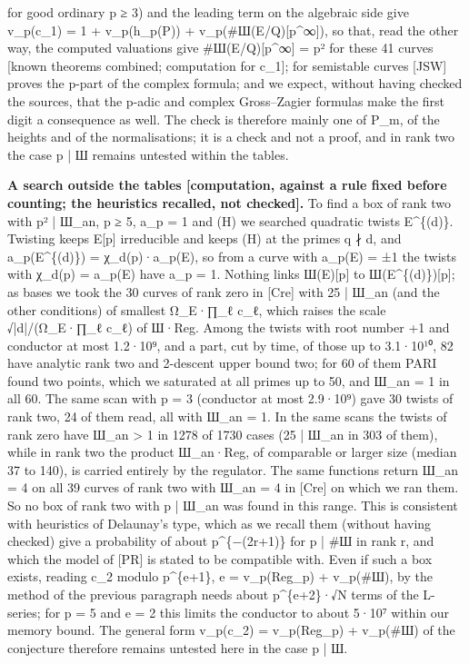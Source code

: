 \documentclass[11pt,a4paper]{article}
\theoremstyle{named}
\begin{document}
for good ordinary p ≥ 3) and the leading term on the algebraic side give v\_p(c\_1) = 1 + v\_p(h\_p(P)) + v\_p(\#Ш(E/Q)[p\textasciicircum{}∞]), so that, read the other way, the computed valuations give \#Ш(E/Q)[p\textasciicircum{}∞] = p² for these 41 curves [known theorems combined; computation for c\_1]; for semistable curves [JSW] proves the p-part of the complex formula; and we expect, without having checked the sources, that the p-adic and complex Gross–Zagier formulas make the first digit a consequence as well. The check is therefore mainly one of P\_m, of the heights and of the normalisations; it is a check and not a proof, and in rank two the case p | Ш remains untested within the tables.

\textbf{A search outside the tables [computation, against a rule fixed before counting; the heuristics recalled, not checked].} To find a box of rank two with p² | Ш\_an, p ≥ 5, a\_p = 1 and (H) we searched quadratic twists E\textasciicircum{}\{(d)\}. Twisting keeps E[p] irreducible and keeps (H) at the primes q ∤ d, and a\_p(E\textasciicircum{}\{(d)\}) = χ\_d(p)·a\_p(E), so from a curve with a\_p(E) = ±1 the twists with χ\_d(p) = a\_p(E) have a\_p = 1. Nothing links Ш(E)[p] to Ш(E\textasciicircum{}\{(d)\})[p]; as bases we took the 30 curves of rank zero in [Cre] with 25 | Ш\_an (and the other conditions) of smallest Ω\_E·∏\_ℓ c\_ℓ, which raises the scale √|d|/(Ω\_E·∏\_ℓ c\_ℓ) of Ш·Reg. Among the twists with root number +1 and conductor at most 1.2·10⁹, and a part, cut by time, of those up to 3.1·10¹⁰, 82 have analytic rank two and 2-descent upper bound two; for 60 of them PARI found two points, which we saturated at all primes up to 50, and Ш\_an = 1 in all 60. The same scan with p = 3 (conductor at most 2.9·10⁹) gave 30 twists of rank two, 24 of them read, all with Ш\_an = 1. In the same scans the twists of rank zero have Ш\_an \textgreater{} 1 in 1278 of 1730 cases (25 | Ш\_an in 303 of them), while in rank two the product Ш\_an·Reg, of comparable or larger size (median 37 to 140), is carried entirely by the regulator. The same functions return Ш\_an = 4 on all 39 curves of rank two with Ш\_an = 4 in [Cre] on which we ran them. So no box of rank two with p | Ш\_an was found in this range. This is consistent with heuristics of Delaunay's type, which as we recall them (without having checked) give a probability of about p\textasciicircum{}\{−(2r+1)\} for p | \#Ш in rank r, and which the model of [PR] is stated to be compatible with. Even if such a box exists, reading c\_2 modulo p\textasciicircum{}\{e+1\}, e = v\_p(Reg\_p) + v\_p(\#Ш), by the method of the previous paragraph needs about p\textasciicircum{}\{e+2\}·√N terms of the L-series; for p = 5 and e = 2 this limits the conductor to about 5·10⁷ within our memory bound. The general form v\_p(c\_2) = v\_p(Reg\_p) + v\_p(\#Ш) of the conjecture therefore remains untested here in the case p | Ш.
\end{document}
